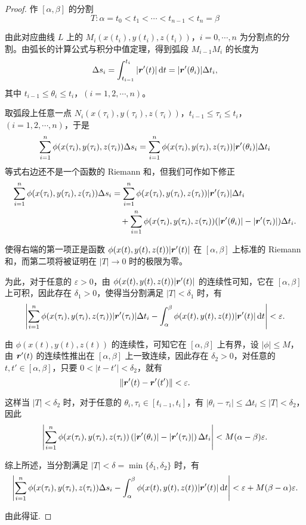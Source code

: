 \begin{proof}
    作 \( [\alpha, \beta] \) 的分割
\[
T : \alpha = t_0 < t_1 < \cdots < t_{n-1} < t_n = \beta
\]

由此对应曲线 \( L \) 上的 \( M_i(x(t_i), y(t_i), z(t_i)) \)，\( i = 0, \cdots, n \) 为分割点的分割。由弧长的计算公式与积分中值定理，得到弧段 \( M_{i-1}M_i \) 的长度为
\[
\Delta s_i = \int_{t_{i-1}}^{t_i} |\bm{r}'(t)| \operatorname{d\!} t = |\bm{r}'(\theta_i)| \Delta t_i,
\]
其中 \( t_{i-1} \leq \theta_i \leq t_i \)，\( (i = 1, 2, \cdots, n) \)。

取弧段上任意一点 \( N_i(x(\tau_i), y(\tau_i), z(\tau_i)) \)，\( t_{i-1} \leq \tau_i \leq t_i \)，\( (i = 1, 2, \cdots, n) \)，于是
\[
\sum_{i=1}^n \phi(x(\tau_i), y(\tau_i), z(\tau_i)) \Delta s_i = \sum_{i=1}^n \phi(x(\tau_i), y(\tau_i), z(\tau_i)) |\bm{r}'(\theta_i)| \Delta t_i
\]
等式右边还不是一个函数的 Riemann 和，但我们可作如下修正
\begin{align*}
\sum_{i=1}^n \phi(x(\tau_i), y(\tau_i), z(\tau_i)) \Delta s_i
&= \sum_{i=1}^n \phi(x(\tau_i), y(\tau_i), z(\tau_i)) |\bm{r}'(\tau_i)| \Delta t_i \\
&\quad + \sum_{i=1}^n \phi(x(\tau_i), y(\tau_i), z(\tau_i)) (|\bm{r}'(\theta_i)| - |\bm{r}'(\tau_i)|) \Delta t_i.
\end{align*}

使得右端的第一项正是函数 \( \phi(x(t), y(t), z(t))|\bm{r}'(t)| \) 在 \( [\alpha, \beta] \) 上标准的 Riemann 和，而第二项将被证明在 \( |T| \to 0 \) 时的极限为零。

为此，对于任意的 \( \varepsilon > 0 \)，由 \( \phi(x(t), y(t), z(t))|\bm{r}'(t)| \) 的连续性可知，它在 \( [\alpha, \beta] \) 上可积，因此存在 \( \delta_1 > 0 \)，使得当分割满足 \( |T| < \delta_1 \) 时，有
\[
\left| \sum_{i=1}^n \phi(x(\tau_i), y(\tau_i), z(\tau_i))|\bm{r}'(\tau_i)| \Delta t_i - \int_{\alpha}^{\beta} \phi(x(t), y(t), z(t))|\bm{r}'(t)| \operatorname{d\!} t \right| < \varepsilon.
\]

由 \( \phi(x(t), y(t), z(t)) \) 的连续性，可知它在 \( [\alpha, \beta] \) 上有界，设 \( |\phi| \leq M \)，由 \( \bm{r}'(t) \) 的连续性推出在 \( [\alpha, \beta] \) 上一致连续，因此存在 \( \delta_2 > 0 \)，对任意的 \( t, t' \in [\alpha, \beta] \)，只要 \( 0 < |t - t'| < \delta_2 \)，就有
\[
\left\| \bm{r}'(t) - \bm{r}'(t') \right\| < \varepsilon.
\]

这样当 \( |T| < \delta_2 \) 时，对于任意的 \( \theta_i, \tau_i \in [t_{i-1}, t_i] \)，有 \( |\theta_i - \tau_i| \leq \Delta t_i \leq |T| < \delta_2 \)，因此
\[
\left| \sum_{i=1}^n \phi(x(\tau_i), y(\tau_i), z(\tau_i)) \left( |\bm{r}'(\theta_i)| - |\bm{r}'(\tau_i)| \right) \Delta t_i \right| < M(\alpha - \beta)\varepsilon.
\]

综上所述，当分割满足 \( |T| < \delta = \min\{\delta_1, \delta_2\} \) 时，有
\[
\left| \sum_{i=1}^n \phi(x(\tau_i), y(\tau_i), z(\tau_i)) \Delta s_i - \int_{\alpha}^{\beta} \phi(x(t), y(t), z(t))|\bm{r}'(t)| \operatorname{d\!} t \right| < \varepsilon + M(\beta - \alpha)\varepsilon.
\]

由此得证.
\end{proof}


